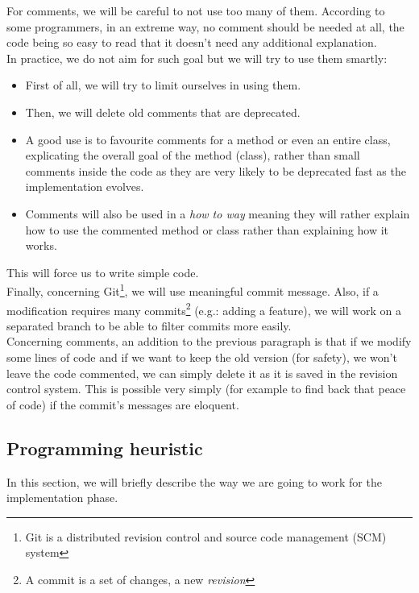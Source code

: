 For comments, we will be careful to not use too many of them. According to some programmers, in an extreme way, no comment should be needed at all, the code being so easy to read that it doesn't need any additional explanation.\\
In practice, we do not aim for such goal but we will try to use them smartly:
\begin{itemize}
	\item First of all, we will try to limit ourselves in using them.
	\item Then, we will delete old comments that are deprecated.
	\item A good use is to favourite comments for a method or even an entire class, explicating the overall goal of the method (class), rather than small comments inside the code as they are very likely to be deprecated fast as the implementation evolves.
	\item Comments will also be used in a \textit{how to way} meaning they will rather explain how to use the commented method or class rather than explaining how it works.
\end{itemize}
This will force us to write simple code.\\

Finally, concerning Git\footnote{Git is a distributed revision control and source code management (SCM) system}, we will use meaningful commit message. Also, if a modification requires many commits\footnote{A commit is a set of changes, a new \textit{revision}} (e.g.: adding a feature), we will work on a separated branch to be able to filter commits more easily.\\

Concerning comments, an addition to the previous paragraph is that if we modify some lines of code and if we want to keep the old version (for safety), we won't leave the code commented, we can simply delete it as it is saved in the revision control system. This is possible very simply (for example to find back that peace of code) if the commit's messages are eloquent.

\subsection{Programming heuristic}

In this section, we will briefly describe the way we are going to work for the implementation phase.

